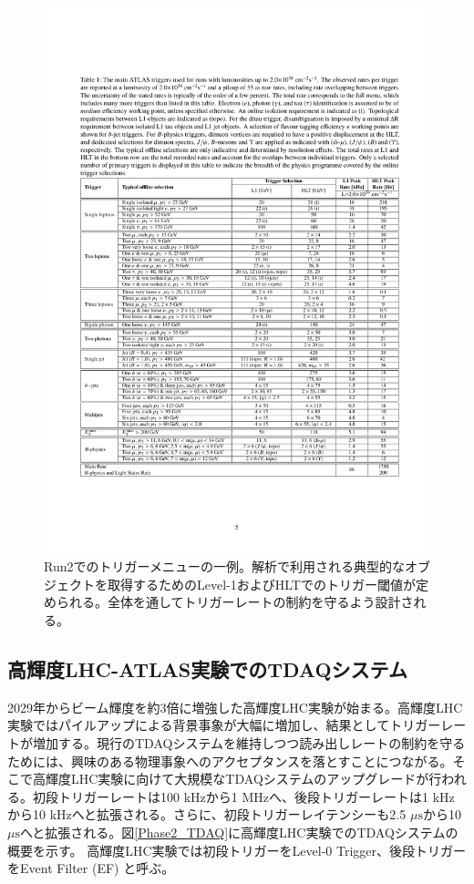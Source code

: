     \begin{figure} 
    \centering
    \includegraphics[width=16cm]{fig/Intro/Run2_Triggermenu.pdf}
    \caption[Run2でのトリガーメニューの一例]{Run2でのトリガーメニューの一例\cite{Run2_Triggermenu}。解析で利用される典型的なオブジェクトを取得するためのLevel-1およびHLTでのトリガー閾値が定められる。全体を通してトリガーレートの制約を守るよう設計される。}
    \label{Run2_Triggermenu}
    \end{figure}

    \subsection{高輝度LHC-ATLAS実験でのTDAQシステム}
2029年からビーム輝度を約3倍に増強した高輝度LHC実験が始まる。高輝度LHC実験ではパイルアップによる背景事象が大幅に増加し、結果としてトリガーレートが増加する。現行のTDAQシステムを維持しつつ読み出しレートの制約を守るためには、興味のある物理事象へのアクセプタンスを落とすことにつながる。そこで高輝度LHC実験に向けて大規模なTDAQシステムのアップグレードが行われる。初段トリガーレートは100 kHzから1 MHzへ、後段トリガーレートは1 kHzから10 kHzへと拡張される。さらに、初段トリガーレイテンシーも2.5 $\mu\mathrm{s}$から10 $\mu\mathrm{s}$へと拡張される。図\ref{Phase2_TDAQ}に高輝度LHC実験でのTDAQシステムの概要を示す。
高輝度LHC実験では初段トリガーをLevel-0 Trigger、後段トリガーをEvent Filter (EF) と呼ぶ。

